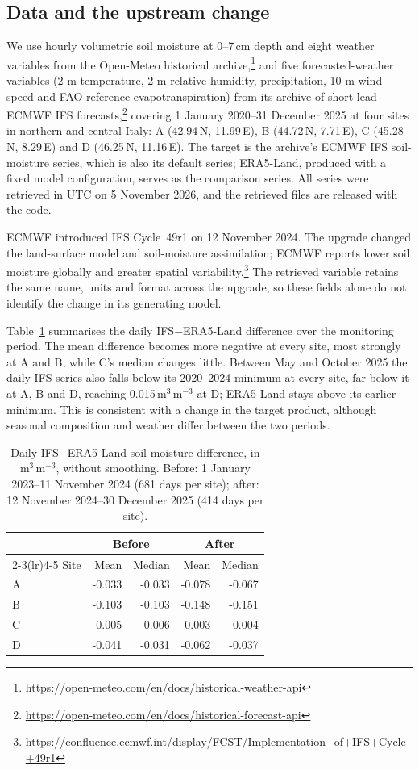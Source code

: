 \documentclass[preprint,12pt]{elsarticle}
\begin{document}
\subsection{Data and the upstream change}
\label{sec:soil-data}
We use hourly volumetric soil moisture at 0--7\,cm depth and eight weather variables from the Open-Meteo historical archive,\footnote{\url{https://open-meteo.com/en/docs/historical-weather-api}} and five forecasted-weather variables (2-m temperature, 2-m relative humidity, precipitation, 10-m wind speed and FAO reference evapotranspiration) from its archive of short-lead ECMWF IFS forecasts,\footnote{\url{https://open-meteo.com/en/docs/historical-forecast-api}} covering 1 January 2020--31 December 2025 at four sites in northern and central Italy: A (42.94\,N, 11.99\,E), B (44.72\,N, 7.71\,E), C (45.28\,N, 8.29\,E) and D (46.25\,N, 11.16\,E). The target is the archive's ECMWF IFS soil-moisture series, which is also its default series; ERA5-Land, produced with a fixed model configuration, serves as the comparison series. All series were retrieved in UTC on 5 November 2026, and the retrieved files are released with the code.

ECMWF introduced IFS Cycle~49r1 on 12 November 2024. The upgrade changed the land-surface model and soil-moisture assimilation; ECMWF reports lower soil moisture globally and greater spatial variability.\footnote{\url{https://confluence.ecmwf.int/display/FCST/Implementation+of+IFS+Cycle+49r1}} The retrieved variable retains the same name, units and format across the upgrade, so these fields alone do not identify the change in its generating model.

Table~\ref{tab:soil-gap} summarises the daily IFS$-$ERA5-Land difference over the monitoring period. The mean difference becomes more negative at every site, most strongly at A and B, while C's median changes little. Between May and October 2025 the daily IFS series also falls below its 2020--2024 minimum at every site, far below it at A, B and D, reaching 0.015\,m$^3$\,m$^{-3}$ at D; ERA5-Land stays above its earlier minimum. This is consistent with a change in the target product, although seasonal composition and weather differ between the two periods.

\begin{table}[htbp]\centering\small
\caption{Daily IFS$-$ERA5-Land soil-moisture difference, in m$^3$\,m$^{-3}$, without smoothing. Before: 1 January 2023--11 November 2024 (681 days per site); after: 12 November 2024--30 December 2025 (414 days per site).}\label{tab:soil-gap}
\begin{tabular}{lrrrr}
\toprule
& \multicolumn{2}{c}{Before} & \multicolumn{2}{c}{After}\\\cmidrule(lr){2-3}\cmidrule(lr){4-5}
Site & Mean & Median & Mean & Median\\\midrule
A & -0.033 & -0.033 & -0.078 & -0.067\\
B & -0.103 & -0.103 & -0.148 & -0.151\\
C & 0.005 & 0.006 & -0.003 & 0.004\\
D & -0.041 & -0.031 & -0.062 & -0.037\\
\bottomrule
\end{tabular}
\end{table}
\end{document}

